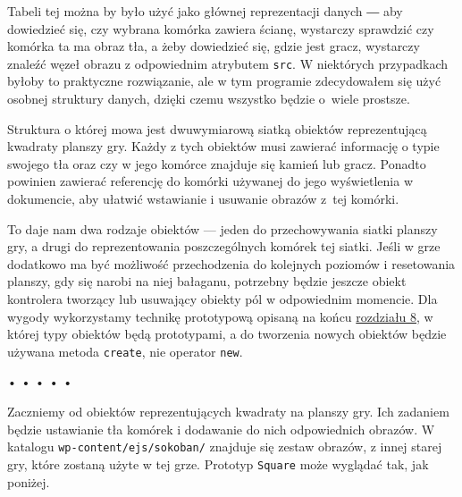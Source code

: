   
Tabeli tej można by było użyć jako głównej reprezentacji danych ― aby dowiedzieć się, czy wybrana komórka zawiera ścianę, wystarczy sprawdzić czy komórka ta ma obraz tła, a żeby dowiedzieć się, gdzie jest gracz, wystarczy znaleźć węzeł obrazu z odpowiednim atrybutem \texttt{src}. W niektórych przypadkach byłoby to praktyczne rozwiązanie, ale w tym programie zdecydowałem się użyć osobnej struktury danych, dzięki czemu wszystko będzie o~wiele prostsze.

  
Struktura o której mowa jest dwuwymiarową siatką obiektów reprezentującą kwadraty planszy gry. Każdy z tych obiektów musi zawierać informację o typie swojego tła oraz czy w jego komórce znajduje się kamień lub gracz. Ponadto powinien zawierać referencję do komórki używanej do jego wyświetlenia w dokumencie, aby ułatwić wstawianie i usuwanie obrazów z~tej komórki.

  
To daje nam dwa rodzaje obiektów — jeden do przechowywania siatki planszy gry, a drugi do reprezentowania poszczególnych komórek tej siatki. Jeśli w grze dodatkowo ma być możliwość przechodzenia do kolejnych poziomów i resetowania planszy, gdy się narobi na niej bałaganu, potrzebny będzie jeszcze obiekt kontrolera tworzący lub usuwający obiekty pól w odpowiednim momencie. Dla wygody wykorzystamy technikę prototypową opisaną na końcu \hyperref[chap:8]{rozdziału 8}, w której typy obiektów będą prototypami, a do tworzenia nowych obiektów będzie używana metoda \texttt{create}, nie operator \texttt{new}.



\begin{center}
• • • • •
\end{center}

  
Zaczniemy od obiektów reprezentujących kwadraty na planszy gry. Ich zadaniem będzie ustawianie tła komórek i dodawanie do nich odpowiednich obrazów. W katalogu \texttt{wp-content/ejs/sokoban/} znajduje się zestaw obrazów, z innej starej gry, które zostaną użyte w tej grze. Prototyp \texttt{Square} może wyglądać tak, jak poniżej.

